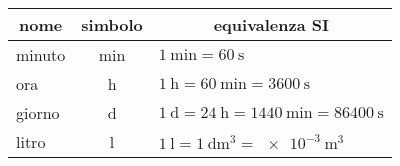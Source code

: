\begin{center}
	\begin{tabular}{lcl}
		\toprule 
		\multicolumn{1}{c}{nome}&simbolo&\multicolumn{1}{c}{equivalenza SI}\\
		\midrule
		minuto&\si{\minute}&$\SI{1}{\minute}=\SI{60}{\second}$\\
		ora&\si{\hour}&$\SI{1}{\hour}=\SI{60}{\minute}=\SI{3600}{\second}$\\
		giorno&\si{\day}&$\SI{1}{\day}=\SI{24}{\hour}=\SI{1440}{\minute} = \SI{86400}{\second}$\\
		litro&\si{\litre}&$\SI{1}{\litre}=\SI{1}{\deci\metre\tothe{3}}=\SI{e-3}{\metre\tothe{3}}$\\
		\bottomrule
	\end{tabular}
\end{center}
